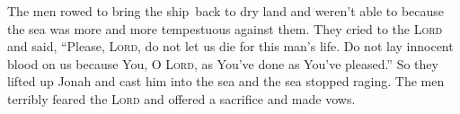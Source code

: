 \begin{inparaenum}
     The men rowed to bring the ship\understood\ back to dry land and weren't able to because the sea was more and more tempestuous against them.%
     They cried to the \textsc{Lord} and said, ``Please, \textsc{Lord}, do not let us die for this man's life. Do not lay innocent blood on us because You, O \textsc{Lord}, as You've done as You've pleased.''%
     So they lifted up Jonah and cast him into the sea and the sea stopped raging.%
     The men terribly feared the \textsc{Lord} and offered a sacrifice and made vows.%
\end{inparaenum}
